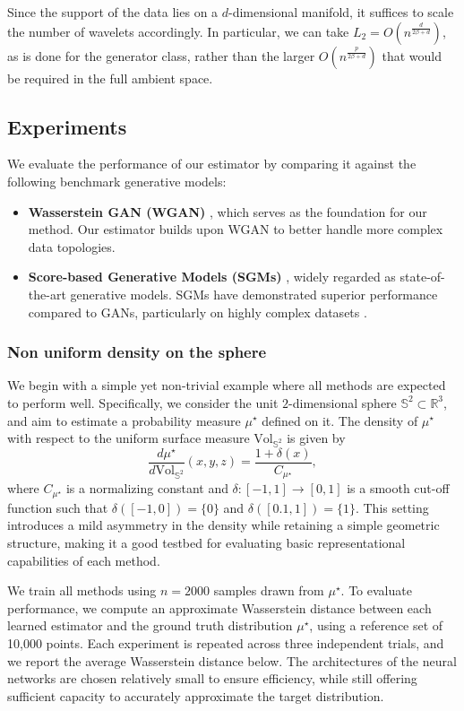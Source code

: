 \documentclass[10pt]{article}
\begin{document}
Since the support of the data lies on a \( d \)-dimensional manifold, it suffices to scale the number of wavelets accordingly. In particular, we can take \( L_2 = O(n^{\frac{d}{2\beta + d}}) \), as is done for the generator class, rather than the larger \( O(n^{\frac{p}{2\beta + d}}) \) that would be required in the full ambient space.

\subsection{Experiments}
We evaluate the performance of our estimator by comparing it against the following benchmark generative models:
\begin{itemize}
    \item \textbf{Wasserstein GAN (WGAN)} \citep{arjovsky2017wasserstein}, which serves as the foundation for our method. Our estimator builds upon WGAN to better handle more complex data topologies.
    \item \textbf{Score-based Generative Models (SGMs)} \citep{song2020score}, widely regarded as state-of-the-art generative models. SGMs have demonstrated superior performance compared to GANs, particularly on highly complex datasets \citep{dhariwal2021diffusion}.
\end{itemize}


\subsubsection{Non uniform density on the sphere}
We begin with a simple yet non-trivial example where all methods are expected to perform well. Specifically, we consider the unit \( 2 \)-dimensional sphere \( \mathbb{S}^2 \subset \mathbb{R}^3 \), and aim to estimate a probability measure \( \mu^\star \) defined on it. The density of \( \mu^\star \) with respect to the uniform surface measure \( \text{Vol}_{\mathbb{S}^2} \) is given by
\[
\frac{d\mu^\star}{d\text{Vol}_{\mathbb{S}^2}}(x, y, z) = \frac{1 + \delta(x)}{C_{\mu^\star}},
\]
where $C_{\mu^\star}$ is a normalizing constant and $\delta:[-1,1]\rightarrow [0,1]$ is a smooth cut-off function such that $\delta([-1,0])=\{0\}$ and $\delta([0.1,1])=\{1\}$. This setting introduces a mild asymmetry in the density while retaining a simple geometric structure, making it a good testbed for evaluating basic representational capabilities of each method.

We train all methods using \( n = 2000 \) samples drawn from \( \mu^\star \). To evaluate performance, we compute an approximate Wasserstein distance between each learned estimator and the ground truth distribution \( \mu^\star \), using a reference set of 10,000 points. Each experiment is repeated across three independent trials, and we report the average Wasserstein distance below. The architectures of the neural networks are chosen relatively small to ensure efficiency, while still offering sufficient capacity to accurately approximate the target distribution.
\end{document}
